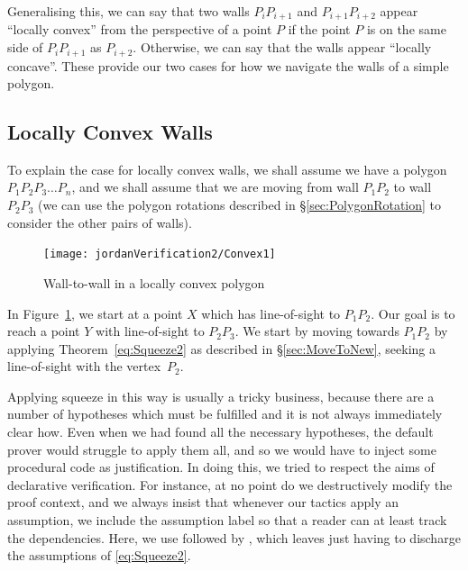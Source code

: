Generalising this, we can say that two walls $P_{i}P_{i+1}$ and $P_{i+1}P_{i+2}$ appear ``locally convex'' from the perspective of a point $P$ if the point $P$ is on the same side of $P_{i}P_{i+1}$ as $P_{i+2}$. Otherwise, we can say that the walls appear ``locally concave''. These provide our two cases for how we navigate the walls of a simple polygon.

\subsection{Locally Convex Walls}\label{sec:ConcaveMove}
To explain the case for locally convex walls, we shall assume we have a polygon $P_1P_2P_3\ldots P_n$, and we shall assume that we are moving from wall $P_1P_2$ to wall $P_2P_3$ (we can use the polygon rotations described in \S\ref{sec:PolygonRotation} to consider the other pairs of walls).

\begin{figure}
\centering\texttt{[image: jordanVerification2/Convex1]}
\caption{Wall-to-wall in a locally convex polygon}
\label{fig:Convex1}
\end{figure}

In Figure~\ref{fig:Convex1}, we start at a point $X$ which has line-of-sight to $P_1P_2$. Our goal is to reach a point $Y$ with line-of-sight to $P_2P_3$. We start by moving towards $P_1P_2$ by applying Theorem~\ref{eq:Squeeze2} as described in \S\ref{sec:MoveToNew}, seeking a line-of-sight with the vertex~$P_2$. 

\label{sec:InjectingProcedural}Applying squeeze in this way is usually a tricky business, because there are a number of hypotheses which must be fulfilled and it is not always immediately clear how. Even when we had found all the necessary hypotheses, the default  prover would struggle to apply them all, and so we would have to inject some procedural code as justification. In doing this, we tried to respect the aims of declarative verification. For instance, at no point do we destructively modify the proof context, and we always insist that whenever our tactics apply an assumption, we include the assumption label so that a reader can at least track the dependencies. Here, we use  followed by , which leaves  just having to discharge the assumptions of \eqref{eq:Squeeze2}.


